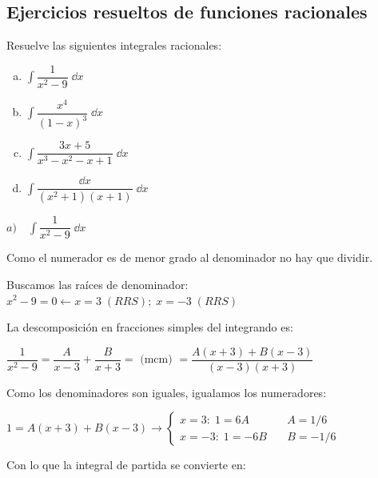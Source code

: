 {\begin{ejem}
\end{ejem}


\subsection{Ejercicios resueltos de funciones racionales}

\begin{ejre} Resuelve las siguientes integrales racionales:
\begin{multicols}{2}
\begin{enumerate}[a) ]
\item  $\displaystyle \int \dfrac {1}{x^2-9}\; \dd x$
\item  $\displaystyle \int \dfrac {x^4}{(1-x)^3} \; \dd x$
\item  $\displaystyle \int \dfrac {3x+5}{x^3-x^2-x+1}\; \dd x$
\item  $\displaystyle \int \dfrac {\dd x}{(x^2+1)(x+1)} \; \dd x$	
\end{enumerate}
\end{multicols}	
\end{ejre}

\begin{proofw}\renewcommand{\qedsymbol}{$\diamond$}	 

$a) \quad \displaystyle \int \dfrac {1}{x^2-9}\; \dd x$

Como el numerador es de menor grado al denominador no hay que dividir.

Buscamos las raíces de denominador: $x^2-9=0 \leftarrow x=3 	\; (RRS); \; x=-3 \; (RRS)$

La descomposición en fracciones simples del integrando es:

$\dfrac {1}{x^2-9}= \dfrac {A}{x-3} + \dfrac {B}{x+3} =  \text{ (mcm) } = \dfrac {A(x+3)+B(x-3)}{(x-3)(x+3)}$

Como los denominadores son iguales, igualamos los numeradores: 

$1=A(x+3)+B(x-3) \to \begin{cases}
 					x=3 : \;  1=6A  &   \quad  A=1/6 \\
 					x=-3 : \;  1=-6B &  \quad B=-1/6
					 \end{cases}$
					 
Con lo que la integral de partida se convierte en:


\end{proofw}}
